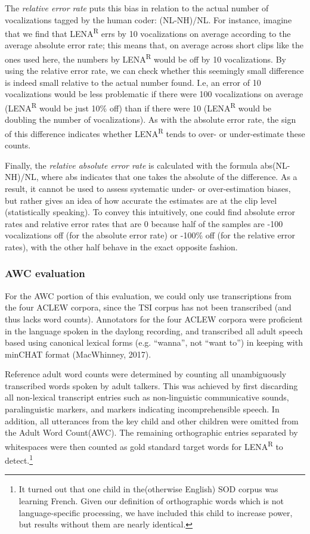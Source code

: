 \documentclass[english,table,man,floatsintext]{apa6}
\let\rmarkdownfootnote\footnote%
\def\footnote{\protect\rmarkdownfootnote}
\begin{document}
The \emph{relative error rate} puts this bias in relation to the actual number of vocalizations tagged by the human coder: (NL-NH)/NL. For instance, imagine that we find that LENA\textsuperscript{R} errs by 10 vocalizations on average according to the average absolute error rate; this means that, on average across short clips like the ones used here, the numbers by LENA\textsuperscript{R} would be off by 10 vocalizations. By using the relative error rate, we can check whether this seemingly small difference is indeed small relative to the actual number found. I.e, an error of 10 vocalizations would be less problematic if there were 100 vocalizations on average (LENA\textsuperscript{R} would be just 10\% off) than if there were 10 (LENA\textsuperscript{R} would be doubling the number of vocalizations). As with the absolute error rate, the sign of this difference indicates whether LENA\textsuperscript{R} tends to over- or under-estimate these counts.

Finally, the \emph{relative absolute error rate} is calculated with the formula abs(NL-NH)/NL, where abs indicates that one takes the absolute of the difference. As a result, it cannot be used to assess systematic under- or over-estimation biases, but rather gives an idea of how accurate the estimates are at the clip level (statistically speaking). To convey this intuitively, one could find absolute error rates and relative error rates that are 0 because half of the samples are -100 vocalizations off (for the absolute error rate) or -100\% off (for the relative error rates), with the other half behave in the exact opposite fashion.

\hypertarget{awc-evaluation}{%
\subsubsection{AWC evaluation}\label{awc-evaluation}}

For the AWC portion of this evaluation, we could only use transcriptions from the four ACLEW corpora, since the TSI corpus has not been transcribed (and thus lacks word counts). Annotators for the four ACLEW corpora were proficient in the language spoken in the daylong recording, and transcribed all adult speech based using canonical lexical forms (e.g. \enquote{wanna}, not \enquote{want to}) in keeping with minCHAT format (MacWhinney, 2017).

Reference adult word counts were determined by counting all unambiguously transcribed words spoken by adult talkers. This was achieved by first discarding all non-lexical transcript entries such as non-linguistic communicative sounds, paralinguistic markers, and markers indicating incomprehensible speech. In addition, all utterances from the key child and other children were omitted from the Adult Word Count(AWC). The remaining orthographic entries separated by whitespaces were then counted as gold standard target words for LENA\textsuperscript{R} to detect.\footnote{It turned out that one child in the(otherwise English) SOD corpus was learning French. Given our definition of orthographic words which is not language-specific processing, we have included this child to increase power, but results without them are nearly identical.}
\end{document}
